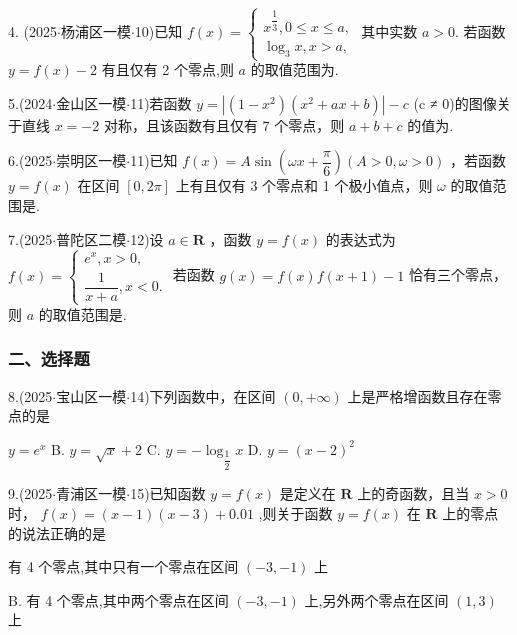 4. (2025$\cdot$杨浦区一模$\cdot$10)已知 $f\left( x\right)  = \left\{  \begin{array}{l} {x}^{\dfrac{1}{3}},0 \leq  x \leq  a, \\  {\log }_{3}x,x > a, \end{array}\right.$ 其中实数 $a > 0$. 若函数 $y = f\left( x\right)  - 2$ 有且仅有 2 个零点,则 $a$ 的取值范围为\blkda[2]{}.

5.(2024$\cdot$金山区一模$\cdot$11)若函数 $y = \left| {\left( {1 - {x}^{2}}\right) \left( {{x}^{2} + {ax} + b}\right) }\right|  - c$ (c ≠ 0)的图像关于直线 $x =  - 2$ 对称，且该函数有且仅有 7 个零点，则 $a + b + c$ 的值为\blkda[2]{}.

6.(2025$\cdot$崇明区一模$\cdot$11)已知 $f\left( x\right)  = A\sin \left( {{\omega x} + \dfrac{\pi }{6}}\right) \left( {A > 0,\omega  > 0}\right)$ ，若函数 $y = f\left( x\right)$ 在区间 $\left\lbrack  {0,{2\pi }}\right\rbrack$ 上有且仅有 3 个零点和 1 个极小值点，则 $\omega$ 的取值范围是\blkda[2]{}.

7.(2025$\cdot$普陀区二模$\cdot$12)设 $a \in  \mathbf{R}$ ，函数 $y = f\left( x\right)$ 的表达式为 $f\left( x\right)  = \left\{  \begin{array}{l} {{e}}^{x},x > 0, \\  \dfrac{1}{x + a},x < 0. \end{array}\right.$ 若函数 $g\left( x\right)  =  f\left( x\right) f\left( {x + 1}\right)  - 1$ 恰有三个零点，则 $a$ 的取值范围是\blkda[2]{}.

\subsubsection*{二、选择题}

8.(2025$\cdot$宝山区一模$\cdot$14)下列函数中，在区间 $\left( {0, + \infty }\right)$ 上是严格增函数且存在零点的是\blkda[2]{} \dotfill{(\kh{})}

\xx{}{}{}{}$y = {{e}}^{x}$ B. $y = \sqrt{x} + 2$ C. $y =  - {\log }_{\dfrac{1}{2}}x$ D. $y = {\left( x - 2\right) }^{2}$

9.(2025$\cdot$青浦区一模$\cdot$15)已知函数 $y = f\left( x\right)$ 是定义在 $\mathbf{R}$ 上的奇函数，且当 $x > 0$ 时， $f\left( x\right)  =  \left( {x - 1}\right) \left( {x - 3}\right)  + {0.01}$ ,则关于函数 $y = f\left( x\right)$ 在 $\mathbf{R}$ 上的零点的说法正确的是 \dotfill{(\kh{})}

\xx{}{}{}{}有 4 个零点,其中只有一个零点在区间 $\left( {-3, - 1}\right)$ 上

B. 有 4 个零点,其中两个零点在区间 $\left( {-3, - 1}\right)$ 上,另外两个零点在区间 $\left( {1,3}\right)$ 上

